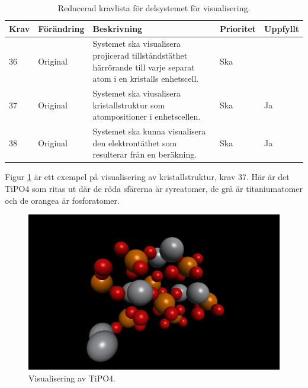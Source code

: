 \documentclass[a4paper,12pt]{article}
\begin{document}
\begin{table}[H]
\caption{Reducerad kravlista för delsystemet för visualisering.}
\begin{center}
\begin{tabular}{ |p{10mm}|p{20mm}|p{70mm}|p{15mm}|p{15mm}|}
\hline
 \textbf{Krav} & \textbf{Förändring} & \textbf{Beskrivning} & \textbf{Prioritet} & \textbf{Uppfyllt}  \\ 
\hline
36 & Original & Systemet ska visualisera projicerad tillståndstäthet härrörande till varje separat atom i en kristalls enhetscell. & Ska &  \\
\hline
37 & Original & Systemet ska viusalisera kristallstruktur som atompositioner i enhetscellen. & Ska & Ja \\
\hline
38 & Original & Systemet ska kunna visualisera den elektrontäthet som resulterar från en beräkning. & Ska & Ja \\
\hline
\end{tabular}
\label{table:kravlista visualisering}
\end{center}
\end{table}

Figur \ref{fig:visualisering_TiPO4} är ett exempel på visualisering av kristallstruktur, krav 37. Här är det TiPO4 som ritas ut där de röda sfärerna är syreatomer, de grå är titaniumatomer och de orangea är fosforatomer.
\begin{figure}[H]
	\centering
	\includegraphics[scale=0.2]{TiPO4_visualisering.png}
	\caption{Visualisering av TiPO4.}
	\label{fig:visualisering_TiPO4}
\end{figure}
\end{document}
